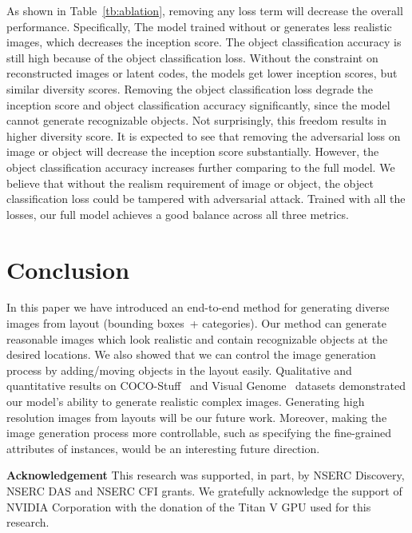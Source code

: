 \documentclass[10pt,twocolumn,letterpaper]{article}
\begin{document}
As shown in Table~\ref{tb:ablation}, removing any loss term will decrease the overall performance.
Specifically, The model trained without  or  generates less realistic images, which decreases the inception score. The object classification accuracy is still high because of the object classification loss.
Without the constraint on reconstructed images or latent codes, the models get lower inception scores, but similar diversity scores.
Removing the object classification loss degrade the inception score and object classification accuracy significantly, since the model cannot generate recognizable objects. Not surprisingly, this freedom results in higher diversity score.
It is expected to see that removing the adversarial loss on image or object will decrease the inception score substantially. 
However, the object classification accuracy increases further comparing to the full model. We believe that without the realism requirement of image or object, the object classification loss could be tampered with adversarial attack.  
Trained with all the losses, our full model achieves a good balance across all three metrics.


\section{Conclusion}
In this paper we have introduced an end-to-end method for generating diverse images from layout (bounding boxes~+ categories).
Our method can generate reasonable images which look realistic and contain recognizable objects at the desired locations.
We also showed that we can control the image generation process by adding/moving objects in the layout easily.
Qualitative and quantitative results on COCO-Stuff~\cite{caesar2016coco} and Visual Genome~\cite{krishna2017visual} datasets demonstrated our model's ability to generate realistic complex images.
Generating high resolution images from layouts will be our future work. 
Moreover, making the image generation process more controllable, such as specifying the fine-grained attributes of instances, would be an interesting future direction.

\vspace{+0.1in}
\small \noindent \textbf{Acknowledgement}
This research was supported, in part, by NSERC Discovery, NSERC DAS and NSERC CFI grants. 
We gratefully acknowledge the support of NVIDIA Corporation with the donation of the Titan V GPU used for this research.
{\small


}
\end{document}
